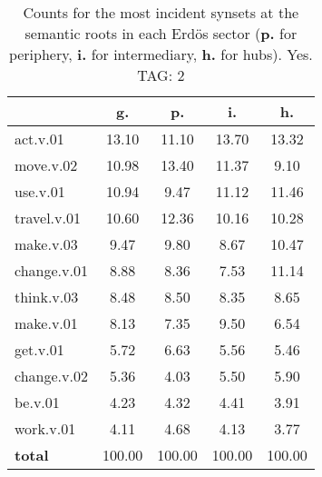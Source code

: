 \begin{table}[h!]
\begin{center}
\begin{tabular}{| l || c | c | c | c |}\hline
 & {\bf g.} & {\bf p.} & {\bf i.} & {\bf h.} \\\hline\hline
act.v.01 & 13.10  & 11.10  & 13.70  & 13.32 \\\hline
move.v.02 & 10.98  & 13.40  & 11.37  & 9.10 \\\hline
use.v.01 & 10.94  & 9.47  & 11.12  & 11.46 \\\hline
travel.v.01 & 10.60  & 12.36  & 10.16  & 10.28 \\\hline
make.v.03 & 9.47  & 9.80  & 8.67  & 10.47 \\\hline
change.v.01 & 8.88  & 8.36  & 7.53  & 11.14 \\\hline
think.v.03 & 8.48  & 8.50  & 8.35  & 8.65 \\\hline
make.v.01 & 8.13  & 7.35  & 9.50  & 6.54 \\\hline
get.v.01 & 5.72  & 6.63  & 5.56  & 5.46 \\\hline
change.v.02 & 5.36  & 4.03  & 5.50  & 5.90 \\\hline
be.v.01 & 4.23  & 4.32  & 4.41  & 3.91 \\\hline
work.v.01 & 4.11  & 4.68  & 4.13  & 3.77 \\\hline\hline
{{\bf total}} & 100.00  & 100.00  & 100.00  & 100.00 \\\hline
\end{tabular}
\caption{Counts for the most incident synsets at the semantic roots in each Erd\"os sector ({\bf p.} for periphery, {\bf i.} for intermediary, {\bf h.} for hubs). Yes. TAG: 2}
\end{center}
\end{table}